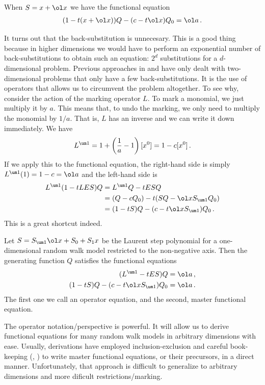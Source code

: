 \begin{example} When $S = x+\ol x$ we have the functional equation
\begin{align}
	(1-t(x+\ol x))Q - (c -t\ol x)Q_0 = \ol a\,.
\end{align}
\end{example}
It turns out that the back-substitution is unnecesary. This is a good thing because in higher dimensions we would have to perform an exponential number of back-substitutions to obtain such an equation: $2^d$ substitutions for a $d$-dimensional problem. Previous approaches in \cite{tabbara2014exact} and \cite{wong2014confining} have only dealt with two-dimensional problems that only have a few back-substitutions. It is the use of operators that allows us to circumvent the problem altogether. To see why, consider the action of the marking operator $L$. To mark a monomial, we just multiply it by $a$. This means that, to undo the marking, we only need to multiply the monomial by $1/a$. That is, $L$ has an inverse and we can write it down immediately. We have
\begin{align}
	L^{\um 1} = 1 + \left(\frac 1a - 1\right)[x^0] = 1- c[x^0]\,.
\end{align}
If we apply this to the functional equation, the right-hand side is simply $L^{\um 1} (1) = 1 - c = \ol a$ and the left-hand side is
\begin{align}
	L^{\um 1}(1-tLES)Q &= L^{\um 1}Q - tESQ \\
	&= (Q-cQ_0) - t(SQ - \ol xS_{\um 1}Q_0) \\
	&= (1-tS)Q - (c-t\ol xS_{\um 1})Q_0\,. 
\end{align}
This is a great shortcut indeed.
\begin{prop} Let $S = S_{\um 1}\ol x+S_0 + S_1 x$ be the Laurent step polynomial for a one-dimensional random walk model restricted to the non-negative axis. Then the generating function $Q$ satisfies the functional equations
\begin{align}
	(L^{\um 1}-tES)Q &= \ol a\,,\\
	(1-tS)Q-(c-t\ol xS_{\um 1})Q_0 &= \ol a\,.
\end{align}
The first one we call an operator equation, and the second, master functional equation.
\end{prop}
The operator notation/perspective is powerful. It will allow us to derive functional equations for many random walk models in arbitrary dimensions with ease. Usually, derivations have employed inclusion-exclusion and careful book-keeping (\cite{bousquet2010walks}, \cite{melczer2014variants}) to write master functional equations, or their precursors, in a direct manner. Unfortunately, that approach is difficult to generalize to arbitrary dimensions and more dificult restrictions/marking.

